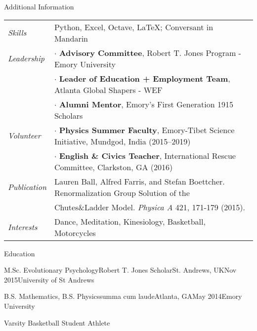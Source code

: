 \documentclass{resume_v3} %
\begin{document}
\vspace{0.4em}
\begin{rSection}{Additional Information}

\begin{tabular}{ @{} >{\em}l @{\hspace{8ex}} l }
Skills & Python, Excel, Octave, LaTeX; Conversant in Mandarin \vspace{0.4em} \\
Leadership & $\cdot$ \textbf{Advisory Committee}, Robert T. Jones Program - Emory University \\  
& $\cdot$ \textbf{Leader of Education + Employment Team}, Atlanta Global Shapers - WEF \\ 
& $\cdot$ \textbf{Alumni Mentor}, Emory’s First Generation 1915 Scholars \vspace{0.4em} \\
Volunteer & $\cdot$ \textbf{Physics Summer Faculty}, Emory-Tibet Science Initiative, Mundgod, India (2015–2019) \\
& $\cdot$ \textbf{English \& Civics Teacher}, International Rescue Committee, Clarkston, GA (2016) 
\vspace{0.4em} \\
Publication & Lauren Ball, Alfred Farris, and Stefan Boettcher. Renormalization Group Solution of the \\
& Chutes\&Ladder Model. {\em Physica A} 421, 171-179 (2015). 
\vspace{0.4em} \\
Interests & Dance, Meditation, Kinesiology, Basketball, Motorcycles 
\end{tabular}

\end{rSection}


\vspace{0.4em}
\begin{rSection}{Education}

\begin{School}{M.Sc. Evolutionary Psychology}{Robert T. Jones Scholar}{St. Andrews, UK}{Nov 2015}{University of St Andrews}
\end{School}

\vspace{0.4em}
\begin{School}
{B.S. Mathematics, B.S. Physics}{summa cum laude}{Atlanta, GA}{May 2014}{Emory University}
\begin{bullets}
\item Varsity Basketball Student Athlete
\end{bullets}
\end{School}

\end{rSection}


\end{document}
